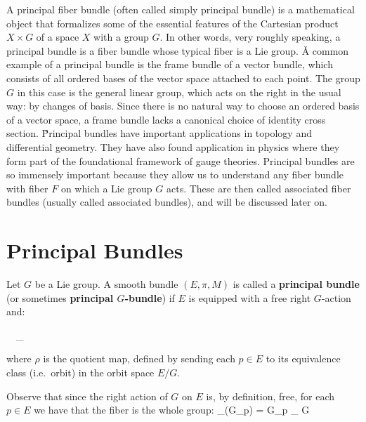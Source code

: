 A principal fiber bundle (often called simply principal bundle) is a mathematical object that formalizes some of the
essential features of the Cartesian product $X \times G$ of a space $X$ with a group $G$. In other words, very
roughly speaking, a principal bundle is a fiber bundle whose typical fiber is a Lie group. \v

A common example of a principal bundle is the frame bundle of a vector bundle, which consists of all ordered bases of
the vector space attached to each point. The group $G$ in this case is the general linear group, which acts on the
right in the usual way: by changes of basis. Since there is no natural way to choose an ordered basis of a vector
space, a frame bundle lacks a canonical choice of identity cross section. \v

Principal bundles have important applications in topology and differential geometry. They have also found application
in physics where they form part of the foundational framework of gauge theories. Principal bundles are so immensely
important because they allow us to understand any fiber bundle with fiber $F$ on which a Lie group $G$ acts. These
are then called associated fiber bundles (usually called associated bundles), and will be discussed later on.

\section{Principal Bundles}

Let $G$ be a Lie group. A smooth bundle $(E,\pi,M)$ is called a \textbf{principal bundle} (or sometimes
\textbf{principal $G$-bundle}) if $E$ is equipped with a free right $G$-action and:
\bse
{} \ \ \cong_{}
\ese

where $\rho$ is the quotient map, defined by sending each $p\in E$ to its equivalence class (i.e.\ orbit) in the
orbit space $E/G$.
\ed

Observe that since the right action of $G$ on $E$ is, by definition, free, for each $p\in E$ we have that the fiber
is the whole group:
\bse
\preim_\rho(G_p) = G_p \cong_{} G
\ese

